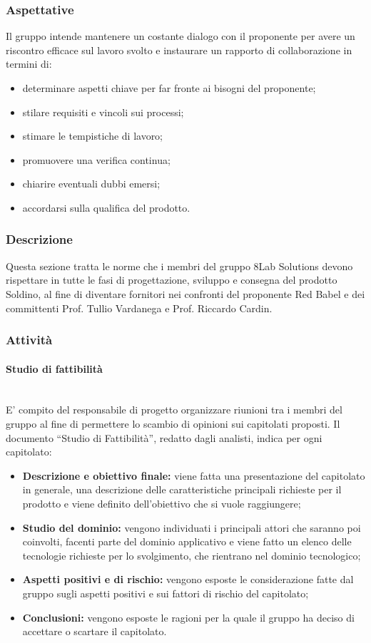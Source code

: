 \subsubsection{Aspettative}
Il gruppo intende mantenere un costante dialogo con il proponente per avere un riscontro efficace sul lavoro svolto e instaurare un rapporto di collaborazione in termini di:
\begin{itemize}
	\item determinare aspetti chiave per far fronte ai bisogni del proponente;
	\item stilare requisiti e vincoli sui processi;
	\item stimare le tempistiche di lavoro;
	\item promuovere una verifica continua;
	\item chiarire eventuali dubbi emersi;
	\item accordarsi sulla qualifica del prodotto.
\end{itemize}
\subsubsection{Descrizione}
Questa sezione tratta le norme che i membri del gruppo 8Lab Solutions devono rispettare in tutte le fasi di progettazione, sviluppo e consegna del prodotto Soldino, al fine di diventare fornitori nei confronti del proponente Red Babel e dei committenti Prof. Tullio Vardanega e Prof. Riccardo Cardin.
\subsubsection{Attività}
\paragraph{Studio di fattibilità} \mbox{}\\ 
E' compito del responsabile di progetto organizzare riunioni tra i membri del gruppo al fine di permettere lo scambio di opinioni sui capitolati proposti.
Il documento ``Studio di Fattibilità'', redatto dagli analisti, indica per ogni capitolato:
\begin{itemize}
	\item \textbf{Descrizione e obiettivo finale:} viene fatta una presentazione del capitolato in generale, una descrizione delle caratteristiche principali richieste per il prodotto e viene definito dell'obiettivo che si vuole raggiungere;
	\item \textbf{Studio del dominio:} vengono individuati i principali attori che saranno poi coinvolti, facenti parte del dominio applicativo e viene fatto un elenco delle tecnologie richieste per lo svolgimento, che rientrano nel dominio tecnologico;
	\item \textbf{Aspetti positivi e di rischio:} vengono esposte le considerazione fatte dal gruppo sugli aspetti positivi e sui fattori di rischio del capitolato;
	\item \textbf{Conclusioni:} vengono esposte le ragioni per la quale il gruppo ha deciso di accettare o scartare il capitolato.
\end{itemize}

